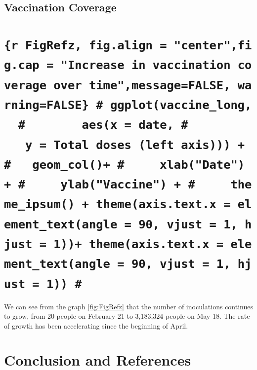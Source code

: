 \documentclass[11pt,a4paper,]{article}
\begin{document}
\hypertarget{vaccination-coverage}{%
\subsection{Vaccination Coverage}\label{vaccination-coverage}}

\hypertarget{r-figrefz-fig.align-centerfig.cap-increase-in-vaccination-coverage-over-timemessagefalse-warningfalse-ggplotvaccine_long-aesx-date-y-total-doses-left-axis-geom_col-xlabdate-ylabvaccine-theme_ipsum-themeaxis.text.x-element_textangle-90-vjust-1-hjust-1-themeaxis.text.x-element_textangle-90-vjust-1-hjust-1}{%
\section{\texorpdfstring{\texttt{\{r\ FigRefz,\ fig.align\ =\ "center",fig.cap\ =\ "Increase\ in\ vaccination\ coverage\ over\ time",message=FALSE,\ warning=FALSE\}\ \#\ ggplot(vaccine\_long,\ \ \#\ \ \ \ \ \ \ \ aes(x\ =\ date,\ \#\ \ \ \ \ \ \ \ \ \ \ \ y\ =\ \textasciigrave{}Total\ doses\ (left\ axis)\textasciigrave{}))\ +\ \#\ \ \ geom\_col()+\ \#\ \ \ \ \ xlab("Date")\ +\ \#\ \ \ \ \ ylab("Vaccine")\ +\ \#\ \ \ \ \ theme\_ipsum()\ +\ theme(axis.text.x\ =\ element\_text(angle\ =\ 90,\ vjust\ =\ 1,\ hjust\ =\ 1))+\ theme(axis.text.x\ =\ element\_text(angle\ =\ 90,\ vjust\ =\ 1,\ hjust\ =\ 1))\ \#}}{\{r FigRefz, fig.align = "center",fig.cap = "Increase in vaccination coverage over time",message=FALSE, warning=FALSE\} \# ggplot(vaccine\_long,  \#        aes(x = date, \#            y = `Total doses (left axis)`)) + \#   geom\_col()+ \#     xlab("Date") + \#     ylab("Vaccine") + \#     theme\_ipsum() + theme(axis.text.x = element\_text(angle = 90, vjust = 1, hjust = 1))+ theme(axis.text.x = element\_text(angle = 90, vjust = 1, hjust = 1)) \#}}\label{r-figrefz-fig.align-centerfig.cap-increase-in-vaccination-coverage-over-timemessagefalse-warningfalse-ggplotvaccine_long-aesx-date-y-total-doses-left-axis-geom_col-xlabdate-ylabvaccine-theme_ipsum-themeaxis.text.x-element_textangle-90-vjust-1-hjust-1-themeaxis.text.x-element_textangle-90-vjust-1-hjust-1}}

We can see from the graph \ref{fig:FigRefz} that the number of inoculations continues to grow, from 20 people on February 21 to 3,183,324 people on May 18. The rate of growth has been accelerating since the beginning of April.

\hypertarget{conclusion-and-references}{%
\section{Conclusion and References}\label{conclusion-and-references}}
\end{document}
